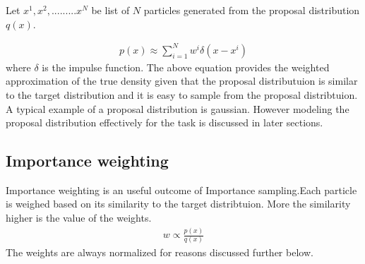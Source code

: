Let ${x^{1},x^{2},.........x^{N}}$ be list of ${N}$ particles generated from the proposal distribution ${q(x)}$.

\begin{gather} \label{Sample}
    p(x) \approx \sum_{i = 1}^{N} w^{i}\delta (x - x^{i})  
\end{gather} 
where $\delta$ is the impulse function. The above equation provides the weighted approximation of the true density given that the proposal distributuion is
similar to the target distribution and it is easy to sample from the proposal distribtuion. A typical example of a proposal distribution is gaussian.
However modeling the proposal distribution effectively for the task is discussed in later sections.

\subsection{Importance weighting}
Importance weighting is an useful outcome of Importance sampling.Each particle is weighed based on its similarity to the target distribtuion. 
More the similarity higher is the value of the weights. 
\begin{gather} \label{ImportanceWeigting}
    w \propto \frac{p(x)}{q(x)} 
\end{gather}
The weights are always normalized for reasons discussed further below.

